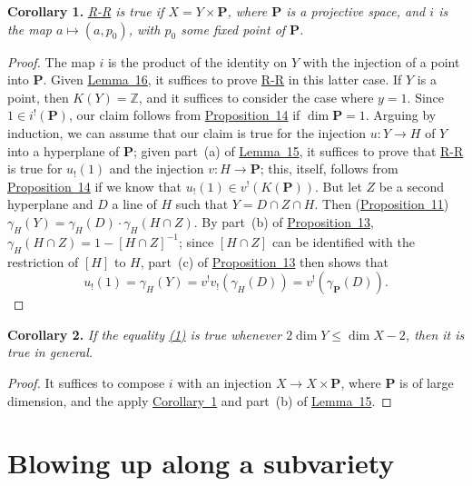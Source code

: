 \documentclass{article}
\newenvironment{itenv}[1]
  {\phantomsection\par\medskip\noindent\textbf{#1.}\itshape}
  {\medskip}
\newcommand{\PP}{\mathbf{P}}
\renewcommand{\leq}{\leqslant}
\begin{document}
\begin{itenv}{Corollary 1}
\label{corollary1}
  \hyperref[theoremriemannroch]{R-R} is true if $X=Y\times\PP$, where $\PP$ is a projective space, and $i$ is the map $a\mapsto(a,p_0)$, with $p_0$ some fixed point of $\PP$.
\end{itenv}

\begin{proof}
  The map $i$ is the product of the identity on $Y$ with the injection of a point into $\PP$.
  Given \hyperref[lemma16]{Lemma~16}, it suffices to prove \hyperref[theoremriemannroch]{R-R} in this latter case.
  If $Y$ is a point, then $K(Y)=\mathbb{Z}$, and it suffices to consider the case where $y=1$.
  Since $1\in i^!(\PP)$, our claim follows from \hyperref[proposition14]{Proposition~14} if $\dim\PP=1$.
  Arguing by induction, we can assume that our claim is true for the injection $u\colon Y\to H$ of $Y$ into a hyperplane of $\PP$;
  given part~(a) of \hyperref[lemma15]{Lemma~15}, it suffices to prove that \hyperref[theoremriemannroch]{R-R} is true for $u_!(1)$ and the injection $v\colon H\to \PP$;
  this, itself, follows from \hyperref[proposition14]{Proposition~14} if we know that $u_!(1)\in v^!(K(\PP))$.
  But let $Z$ be a second hyperplane and $D$ a line of $H$ such that $Y=D\cap Z\cap H$.
  Then (\hyperref[proposition11]{Proposition~11}) $\gamma_H(Y) = \gamma_H(D)\cdot\gamma_H(H\cap Z)$.
  By part~(b) of \hyperref[proposition13]{Proposition~13}, $\gamma_H(H\cap Z)=1-[H\cap Z]^{-1}$;
  since $[H\cap Z]$ can be identified with the restriction of $[H]$ to $H$, part~(c) of \hyperref[proposition13]{Proposition~13} then shows that
  \[
    u_!(1) = \gamma_H(Y) = v^!v_!(\gamma_H(D)) = v^!(\gamma_{\PP}(D)).
  \]
\end{proof}

\begin{itenv}{Corollary 2}
\label{corollary2}
  If the equality \hyperref[section11equation1]{(1)} is true whenever $2\dim Y\leq\dim X-2$, then it is true in general.
\end{itenv}

\begin{proof}
  It suffices to compose $i$ with an injection $X\to X\times\PP$, where $\PP$ is of large dimension, and the apply \hyperref[corollary1]{Corollary~1} and part~(b) of \hyperref[lemma15]{Lemma~15}.
\end{proof}


\section{Blowing up along a subvariety}
\label{section12}
\end{document}

